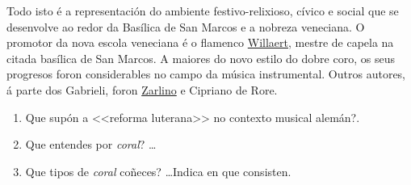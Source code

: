 \begin{multicols}{2}
Todo isto é a representación do ambiente festivo-relixioso, cívico e social que se desenvolve ao redor da Basílica de San Marcos e a nobreza veneciana. O promotor da nova escola veneciana é o flamenco \href{http://es.wikipedia.org/wiki/Adrian_Willaert}{Willaert}, mestre de capela na citada basílica de San Marcos. A maiores do novo estilo do dobre coro, os seus progresos foron considerables no campo da música instrumental. Outros autores, á parte dos Gabrieli, foron \href{http://es.wikipedia.org/wiki/Gioseffo_Zarlino}{Zarlino} e Cipriano de Rore. 

\end{multicols}

\vspace{0.25cm}

\begin{ejercicio}
    \begin{multicols}{2}
     \begin{enumerate}
        \item 
        Que supón a <<reforma luterana>> no contexto musical alemán?.
        \item 
        Que entendes por \emph{coral}? \ldots 
        \item 
        Que tipos de \emph{coral} coñeces? \ldots Indica en que consisten.
     \end{enumerate}
    \end{multicols}
     \hrulefill
\par
\vspace{7cm}
\end{ejercicio}
